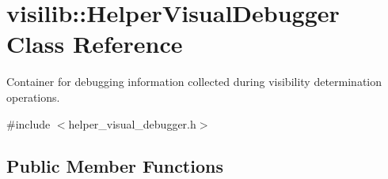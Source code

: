\hypertarget{classvisilib_1_1_helper_visual_debugger}{}\section{visilib\+::Helper\+Visual\+Debugger Class Reference}
\label{classvisilib_1_1_helper_visual_debugger}


Container for debugging information collected during visibility determination operations. 




{\ttfamily \#include $<$helper\+\_\+visual\+\_\+debugger.\+h$>$}

\subsection*{Public Member Functions}
